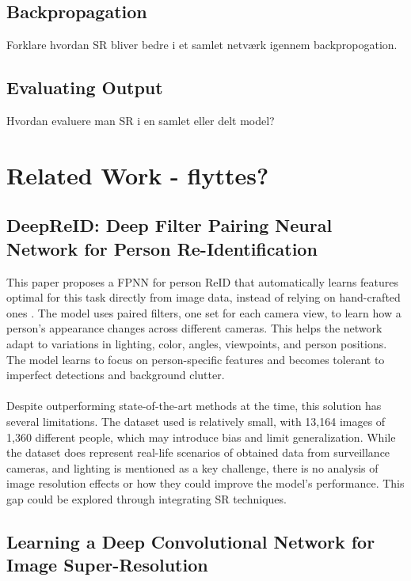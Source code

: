\subsection{Backpropagation}
Forklare hvordan SR bliver bedre i et samlet netværk igennem backpropogation. 

\subsection{Evaluating Output}
Hvordan evaluere man SR i en samlet eller delt model?


\section{Related Work - flyttes?}

\subsection{DeepReID: Deep Filter Pairing Neural Network for Person Re-Identification}

This paper proposes a \ac{FPNN} for person \ac{ReID} that automatically learns features optimal for this task directly from image data, instead of relying on hand-crafted ones \cite{FPNN}. The model uses paired filters, one set for each camera view, to learn how a person’s appearance changes across different cameras. This helps the network adapt to variations in lighting, color, angles, viewpoints, and person positions. The model learns to focus on person-specific features and becomes tolerant to imperfect detections and background clutter. 
\\\\
Despite outperforming state-of-the-art methods at the time, this solution has several limitations. The dataset used is relatively small, with 13,164 images of 1,360 different people, which may introduce bias and limit generalization. While the dataset does represent real-life scenarios of obtained data from surveillance cameras, and lighting is mentioned as a key challenge, there is no analysis of image resolution effects or how they could improve the model’s performance. This gap could be explored through integrating \ac{SR} techniques.  

\subsection{Learning a Deep Convolutional Network for Image Super-Resolution}


